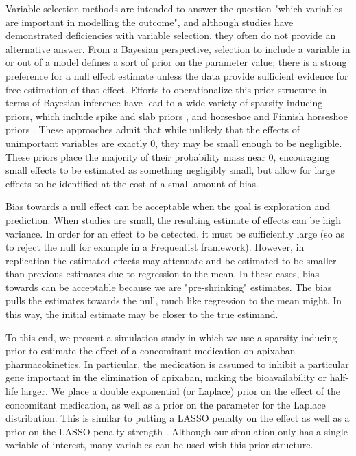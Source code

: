 Variable selection methods are intended to answer the question "which variables are important in modelling the outcome", and although studies have demonstrated deficiencies with variable selection, they often do not provide an alternative answer.  From a Bayesian perspective, selection to include a variable in or out of a model defines a sort of prior on the parameter value; there is a strong preference for a null effect estimate unless the data provide sufficient evidence for free estimation of that effect.  Efforts to operationalize this prior structure in terms of Bayesian inference have lead to a wide variety of sparsity inducing priors, which include spike and slab priors \cite{mitchell1988bayesian}, and horseshoe \cite{carvalho2010horseshoe} and Finnish horseshoe priors \cite{piironen2017sparsity}. These approaches admit that while unlikely that the effects of unimportant variables are exactly 0, they may be small enough to be negligible.  These priors place the majority of their probability mass near 0, encouraging small effects to be estimated as something negligibly small, but allow for large effects to be identified at the cost of a small amount of bias.

Bias towards a null effect  can be acceptable when the goal is exploration and prediction.  When studies are small, the resulting estimate of effects can be high variance.  In order for an effect to be detected, it must be sufficiently large (so as to reject the null for example in a Frequentist framework).  However, in replication the estimated effects may attenuate and be estimated to be smaller than previous estimates due to regression to the mean.   In these cases, bias towards can be acceptable because we are "pre-shrinking" estimates.  The bias pulls the estimates towards the null, much like regression to the mean might.  In this way, the initial estimate may be closer to the true estimand.


To this end, we present a simulation study in which we use a sparsity inducing prior to estimate the effect of a concomitant medication on apixaban pharmacokinetics.  In particular, the medication is assumed to inhibit a particular gene important in the elimination of apixaban, making the bioavailability or half-life larger.  We place a double exponential (or Laplace) prior on the effect of the concomitant medication, as well as a prior on the parameter for the Laplace distribution.  This is similar to putting a LASSO penalty on the effect as well as a prior on the LASSO penalty strength \cite{tibshirani1996regression}.  Although our simulation only has a single variable of interest, many variables can be used with this prior structure.

